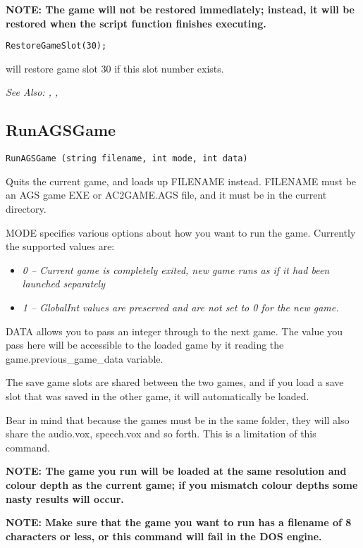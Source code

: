 \bf{NOTE:} The game will not be restored immediately; instead, it will be
restored when the script function finishes executing.

\begin{verbatim}
RestoreGameSlot(30);
\end{verbatim}
will restore game slot 30 if this slot number exists.

\it{See Also:} ,
, 


\subsection{RunAGSGame}\label{RunAGSGame}%

\begin{verbatim}
RunAGSGame (string filename, int mode, int data)
\end{verbatim}
Quits the current game, and loads up FILENAME instead. FILENAME must be an AGS game EXE
or AC2GAME.AGS file, and it must be in the current directory.

MODE specifies various options about how you want to run the game. Currently the supported
values are:
\begin{itemize}
\item \it{0} -- Current game is completely exited, new game runs as if it had been launched separately
\item \it{1} -- GlobalInt values are preserved and are not set to 0 for the new game.
\end{itemize}

DATA allows you to pass an integer through to the next game. The value you pass here
will be accessible to the loaded game by it reading the  game.previous_game_data  variable.

The save game slots are shared between the two games, and if you load a save slot that
was saved in the other game, it will automatically be loaded.

Bear in mind that because the games must be in the same folder, they will also share
the audio.vox, speech.vox and so forth. This is a limitation of this command.

\bf{NOTE:} The game you run will be loaded at the same resolution and colour depth as the
current game; if you mismatch colour depths some nasty results will occur.

\bf{NOTE:} Make sure that the game you want to run has a filename of 8 characters or less,
or this command will fail in the DOS engine.

